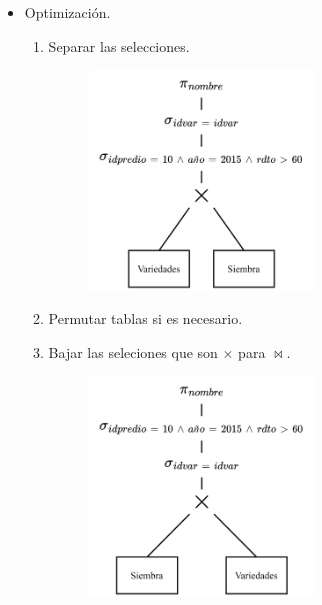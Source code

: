 \documentclass{templateNote}
\begin{document}
\begin{enumerate}
\begin{itemize}
        \newpage
        \item Optimizaci\'on.
        \begin{enumerate}
            \item Separar las selecciones.
            \begin{figure}[H]
                \centering
                \includegraphics[width=0.6\textwidth]{img/E1-Paso-1.png}
            \end{figure}

            \item Permutar tablas si es necesario.

            \item Bajar las seleciones que son $\times$ para $\Join$.
            \begin{figure}[H]
                \centering
                \includegraphics[width=0.6\textwidth]{img/E1-Paso-3.png}
            \end{figure}


\end{enumerate}
\end{itemize}
\end{enumerate}
\end{document}
